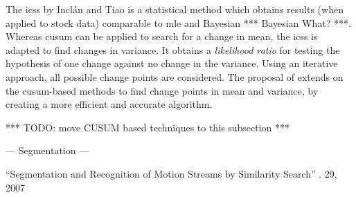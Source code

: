 The \gls{icss} by Incl\'{a}n and Tiao \cite{inclan1994use} is a statistical method which obtains results (when applied to stock data) comparable to \gls{mle} and Bayesian *** Bayesian What? ***.
Whereas \gls{cusum} can be applied to search for a change in mean, the \gls{icss} is adapted to find changes in variance.
It obtains a \emph{likelihood ratio} for testing the hypothesis of one change against no change in the variance.
Using an iterative approach, all possible change points are considered.
The proposal of \cite{cheng2009efficient} extends on the \gls{cusum}-based methods to find change points in mean and variance, by creating a more efficient and accurate algorithm.

*** TODO: move CUSUM based techniques to this subsection ***




--- Segmentation ---





``Segmentation and Recognition of Motion Streams by Similarity Search'' \cite{li2007segmentation}. 29, 2007 \\




